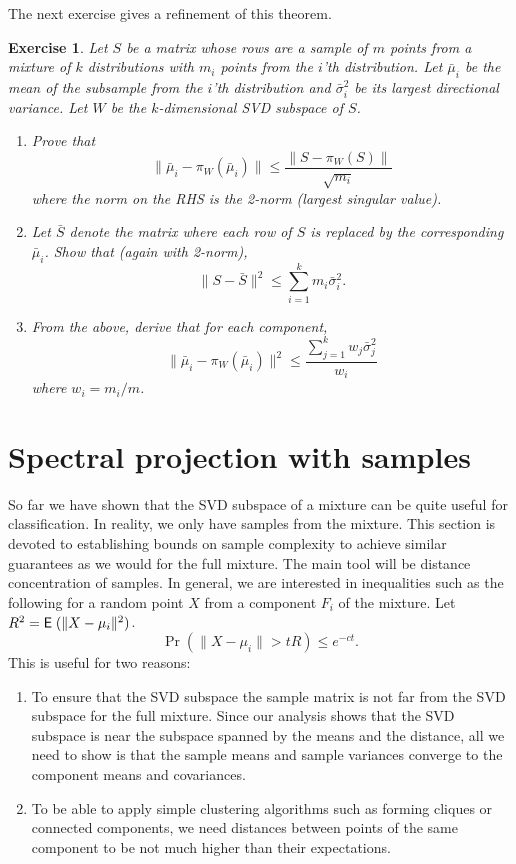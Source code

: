 \documentclass{book}
\newtheorem{exercise}{Exercise}
\numberwithin{exercise}{chapter}
\begin{document}
The next exercise gives a refinement of this theorem.
\begin{exercise}\label{ex:AM}
Let $S$ be a matrix whose rows are a sample of $m$ points from a mixture of $k$ distributions with $m_i$ points from the $i$'th distribution. Let $\bar{\mu}_i$ be the mean of the subsample from the $i$'th distribution and
$\bar{\sigma}_i^2$ be its largest directional variance. Let $W$ be the $k$-dimensional
SVD subspace of $S$.
\begin{enumerate}
\item Prove that
\[
\|\bar{\mu}_i - \pi_W(\bar{\mu}_i)\| \le \frac{\|S-\pi_W(S)\|}{\sqrt{m_i}}
\]
where the norm on the RHS is the 2-norm (largest singular value).
\item Let $\bar{S}$ denote the matrix where each row of $S$ is replaced by the corresponding $\bar{\mu}_i$. Show that (again with 2-norm),
    \[
    \|S-\bar{S}\|^2 \le \sum_{i=1}^k m_i \bar{\sigma}_i^2.
    \]
\item From the above, derive that for each component,
    \[
    \|\bar{\mu}_i - \pi_W(\bar{\mu}_i)\|^2 \le \frac{\sum_{j=1}^k w_j\bar{\sigma}_j^2}{w_i}
    \]
    where $w_i = m_i/m$.
\end{enumerate}
\end{exercise}



\section{Spectral projection with samples}

So far we have shown that the SVD subspace of a mixture can be quite useful for classification. In reality, we only have samples from the mixture. This section is devoted to establishing bounds on
sample complexity to achieve similar guarantees as we would for the full mixture. The main tool will
be distance concentration of samples.
In general, we are interested in inequalities such as the following for a random point $X$ from
a component $F_i$ of the mixture. Let $R^2=\hbox{{\sf E}\;}(\|X-\mu_i\|^2)$.
\[\Pr\left(\|X-\mu_i\| > t R \right)\le e^{-c t}.\]
This is useful for two reasons:
\begin{enumerate}
\item To ensure that the SVD subspace the sample matrix is not far from
the SVD subspace for the full mixture. Since our analysis shows that the SVD subspace is near the subspace spanned by the means and the distance, all we need to show is that the sample means and sample variances converge to the component means and covariances.
\item To be able to apply simple clustering algorithms such as forming cliques or connected components, we need distances between points of the same component to be not much higher than their expectations.
\end{enumerate}
\end{document}
